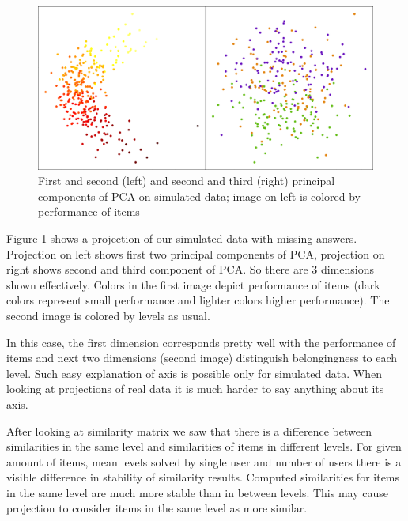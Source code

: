 \documentclass[
  digital, %
  table,   %
  nolof,     %
  nolot,     %
  nocover,
  color,
  final, %
]{fithesis3}
\begin{document}

\begin{figure}
  \includegraphics[width=\textwidth]{img/simulated_missing}
  \caption{First and second (left) and second and third (right) principal components of PCA on simulated data; image on left is colored by performance of items}
  \label{fig:simulated_missing}
\end{figure}

Figure \ref{fig:simulated_missing} shows a projection of our simulated data with missing answers. Projection on left shows first two principal components of PCA, projection on right shows second and third component of PCA. So there are 3 dimensions shown effectively. Colors in the first image depict performance of items (dark colors represent small performance and lighter colors higher performance). The second image is colored by levels as usual.

In this case, the first dimension corresponds pretty well with the performance of items and next two dimensions (second image) distinguish belongingness to each level. Such easy explanation of axis is possible only for simulated data. When looking at projections of real data it is much harder to say anything about its axis.

After looking at similarity matrix we saw that there is a difference between similarities in the same level and similarities of items in different levels. For given amount of items, mean levels solved by single user and number of users there is a visible difference in stability of similarity results. Computed similarities for items in the same level are much more stable than in between levels. This may cause projection to consider items in the same level as more similar.
\end{document}
